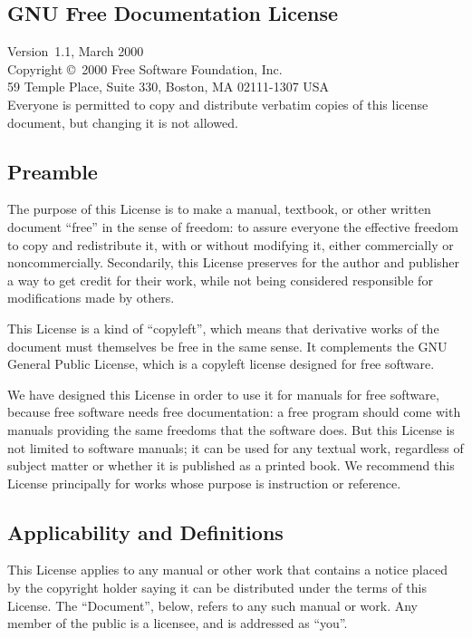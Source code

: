 \documentclass[11pt,a4paper,oneside]{article}
\begin{document}
\begin{albTitlePage}

\section{GNU Free Documentation License}
\label{sec:alb-corp-doc:gnu-free-doc-license}

Version~1.1, March 2000\\[0.25\baselineskip]
Copyright \copyright\ 2000  Free Software Foundation,
Inc.\\[0.25\baselineskip]
59 Temple Place, Suite 330, Boston, MA  02111-1307  USA\\
Everyone is permitted to copy and distribute verbatim copies of this
license document, but changing it is not allowed.


\subsection*{Preamble}

The purpose of this License is to make a manual, textbook, or other
written document ``free'' in the sense of freedom: to assure everyone
the effective freedom to copy and redistribute it, with or without
modifying it, either commercially or noncommercially.  Secondarily, this
License preserves for the author and publisher a way to get credit for
their work, while not being considered responsible for modifications
made by others.

This License is a kind of ``copyleft'', which means that derivative
works of the document must themselves be free in the same sense.  It
complements the GNU General Public License, which is a copyleft license
designed for free software.

We have designed this License in order to use it for manuals for free
software, because free software needs free documentation: a free program
should come with manuals providing the same freedoms that the software
does.  But this License is not limited to software manuals; it can be
used for any textual work, regardless of subject matter or whether it is
published as a printed book.  We recommend this License principally for
works whose purpose is instruction or reference.


\subsection{Applicability and Definitions}
\label{sec:alb-corp-doc:appl-defin}

This License applies to any manual or other work that contains a notice
placed by the copyright holder saying it can be distributed under the
terms of this License.  The ``Document'', below, refers to any such
manual or work.  Any member of the public is a licensee, and is
addressed as ``you''.


\end{albTitlePage}
\end{document}
